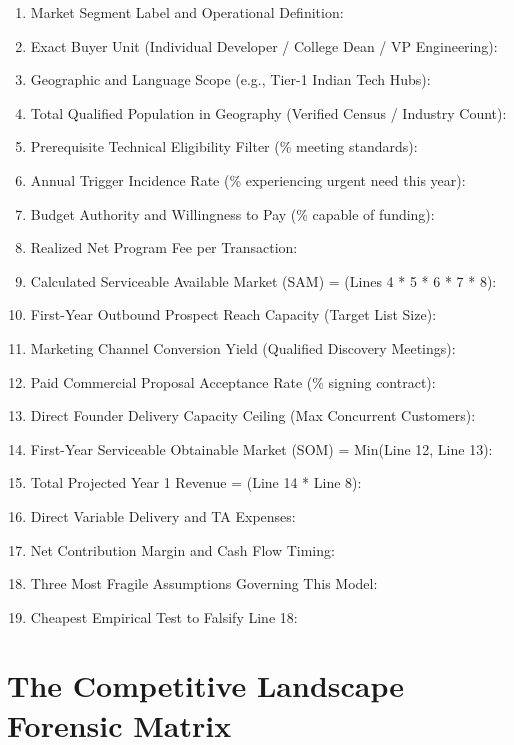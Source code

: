 \begin{tcolorbox}[
  enhanced,
  colback=BayesSurface!60,
  colframe=BayesBorder,
  boxrule=0.5pt,
  arc=3pt,
  left=4pt,right=4pt,top=4pt,bottom=4pt,
  boxsep=1pt
]
\scriptsize\ttfamily
\begin{enumerate}[leftmargin=12pt,itemsep=1.5pt,topsep=1pt,parsep=0pt]
  \item Market Segment Label and Operational Definition:
  \item Exact Buyer Unit (Individual Developer / College Dean / VP Engineering):
  \item Geographic and Language Scope (e.g., Tier-1 Indian Tech Hubs):
  \item Total Qualified Population in Geography (Verified Census / Industry Count):
  \item Prerequisite Technical Eligibility Filter (\% meeting standards):
  \item Annual Trigger Incidence Rate (\% experiencing urgent need this year):
  \item Budget Authority and Willingness to Pay (\% capable of funding):
  \item Realized Net Program Fee per Transaction:
  \item Calculated Serviceable Available Market (SAM) = (Lines 4 * 5 * 6 * 7 * 8):
  \item First-Year Outbound Prospect Reach Capacity (Target List Size):
  \item Marketing Channel Conversion Yield (Qualified Discovery Meetings):
  \item Paid Commercial Proposal Acceptance Rate (\% signing contract):
  \item Direct Founder Delivery Capacity Ceiling (Max Concurrent Customers):
  \item First-Year Serviceable Obtainable Market (SOM) = Min(Line 12, Line 13):
  \item Total Projected Year 1 Revenue = (Line 14 * Line 8):
  \item Direct Variable Delivery and TA Expenses:
  \item Net Contribution Margin and Cash Flow Timing:
  \item Three Most Fragile Assumptions Governing This Model:
  \item Cheapest Empirical Test to Falsify Line 18:
\end{enumerate}
\end{tcolorbox}

\section{The Competitive Landscape Forensic Matrix}

